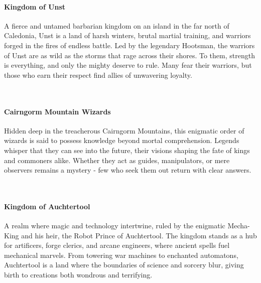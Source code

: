 {\entryfont\paragraph*{Kingdom of Unst} A fierce and untamed barbarian kingdom on an island in the far north of Caledonia, Unst is a land of harsh winters, brutal martial training, and warriors forged in the fires of endless battle. Led by the legendary Hootsman, the warriors of Unst are as wild as the storms that rage across their shores. To them, strength is everything, and only the mighty deserve to rule. Many fear their warriors, but those who earn their respect find allies of unwavering loyalty.}
\hfill\vspace*{-0.5\fontdimen6\font}\\
{\entryfont\paragraph*{Cairngorm Mountain Wizards} Hidden deep in the treacherous Cairngorm Mountains, this enigmatic order of wizards is said to possess knowledge beyond mortal comprehension. Legends whisper that they can see into the future, their visions shaping the fate of kings and commoners alike. Whether they act as guides, manipulators, or mere observers remains a mystery - few who seek them out return with clear answers.}
\hfill\vspace*{-0.5\fontdimen6\font}\\
{\entryfont\paragraph*{Kingdom of Auchtertool} A realm where magic and technology intertwine, ruled by the enigmatic Mecha-King and his heir, the Robot Prince of Auchtertool. The kingdom stands as a hub for artificers, forge clerics, and arcane engineers, where ancient spells fuel mechanical marvels. From towering war machines to enchanted automatons, Auchtertool is a land where the boundaries of science and sorcery blur, giving birth to creations both wondrous and terrifying.}